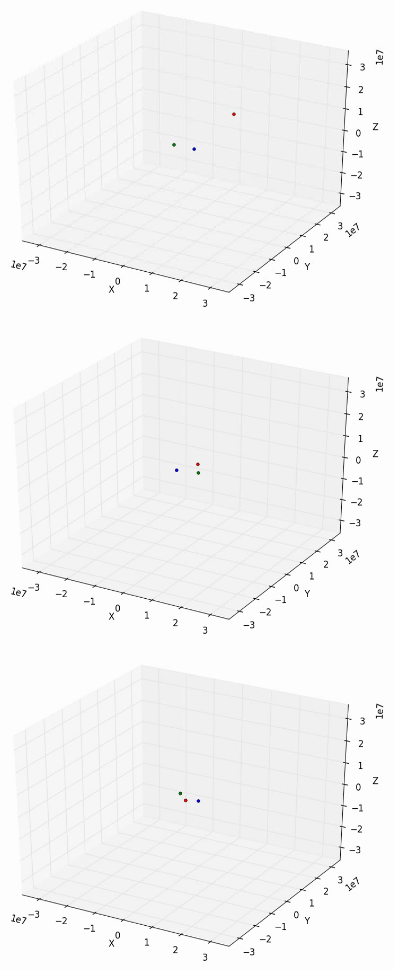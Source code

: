 \documentclass[10pt,letterpaper]{article}
\begin{document}
\begin{figure}[!htb]
  \includegraphics[width=\linewidth]{figures/three_body/5_1.png}
  \subcaption{}\label{fig:5_1}
\endminipage\hfill
{}
  \includegraphics[width=\linewidth]{figures/three_body/5_2.png}
  \subcaption{}\label{fig:5_2}
\endminipage\hfill
{}
  \includegraphics[width=\linewidth]{figures/three_body/5_3.png}

\end{figure}
\end{document}
